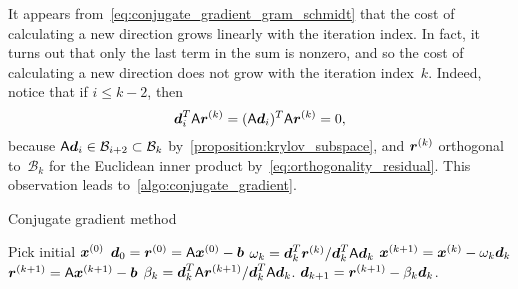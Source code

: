 It appears from~\eqref{eq:conjugate_gradient_gram_schmidt} that the cost of calculating a new direction grows linearly with the iteration index.
In fact, it turns out that only the last term in the sum is nonzero,
and so the cost of calculating a new direction does not grow with the iteration index~$k$.
Indeed, notice that if $i \leq k-2$, then
\[
    \mathbf{\boldsymbol{d}}_i^T \mathsf A \mathbf{\boldsymbol{r}}^{(k)} 
    = (\mathsf A \mathbf{\boldsymbol{d}}_i)^T \mathsf A \mathbf{\boldsymbol{r}}^{(k)}
    = 0,
\]
because $\mathsf A \mathbf{\boldsymbol{d}}_i \in \mathcal B_{i+2} \subset \mathcal B_{k}$ by~\cref{proposition:krylov_subspace},
and $\mathbf{\boldsymbol{r}}^{(k)}$ orthogonal to~$\mathcal B_k$ for the Euclidean inner product by~\eqref{eq:orthogonality_residual}.
This observation leads to~\cref{algo:conjugate_gradient}.
\begin{algorithm}
    \caption{Conjugate gradient method}%
    \label{algo:conjugate_gradient}%
    \begin{algorithmic}[1]
        \State Pick initial $\mathbf{\boldsymbol{x}}^{(0)}$
        \State $\mathbf{\boldsymbol{d}}_0 = \mathbf{\boldsymbol{r}}^{(0)} = \mathsf A \mathbf{\boldsymbol{x}}^{(0)} - \mathbf{\boldsymbol{b}}$
            \EndIf
            \State $\omega_k = \mathbf{\boldsymbol{d}}_k^T \mathbf{\boldsymbol{r}}^{(k)}/\mathbf{\boldsymbol{d}}_k^T \mathsf A \mathbf{\boldsymbol{d}}_k$
            \State $\mathbf{\boldsymbol{x}}^{(k+1)} = \mathbf{\boldsymbol{x}}^{(k)} - \omega_k \mathbf{\boldsymbol{d}}_k$
            \State $\mathbf{\boldsymbol{r}}^{(k+1)} = \mathsf A \mathbf{\boldsymbol{x}}^{(k+1)} - \mathbf{\boldsymbol{b}}$
            \State $\beta_k  = \mathbf{\boldsymbol{d}}_k^T \mathsf A \mathbf{\boldsymbol{r}}^{(k+1)}/\mathbf{\boldsymbol{d}}_k^T \mathsf A \mathbf{\boldsymbol{d}}_k$.
            \State $\mathbf{\boldsymbol{d}}_{k+1}  = \mathbf{\boldsymbol{r}}^{(k+1)} - \beta_k \mathbf{\boldsymbol{d}}_k$.
        \EndFor
    \end{algorithmic}
\end{algorithm}

